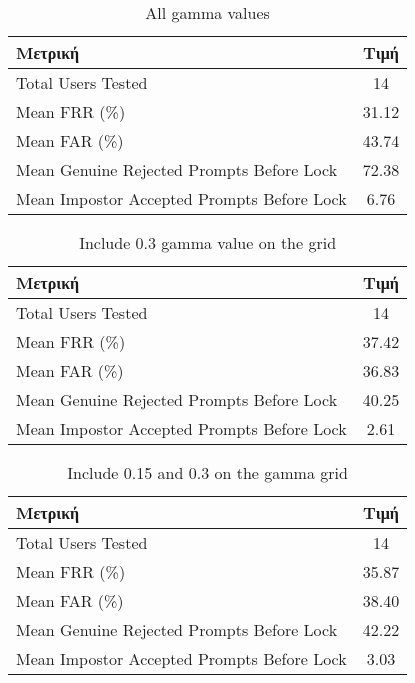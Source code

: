 \begin{table}[H]
\centering
\begin{tabular}{|l|c|}
\hline
\textbf{Μετρική}                                 & \textbf{Τιμή}   \\ \hline
Total Users Tested                               & 14             \\ \hline
Mean FRR (\%)                                    & 31.12          \\ \hline
Mean FAR (\%)                                    & 43.74          \\ \hline
Mean Genuine Rejected Prompts Before Lock       & 72.38          \\ \hline
Mean Impostor Accepted Prompts Before Lock      & 6.76           \\ \hline
\end{tabular}
\caption{All gamma values}
\end{table}

\begin{table}[H]
\centering
\begin{tabular}{|l|c|}
\hline
\textbf{Μετρική}                                 & \textbf{Τιμή}   \\ \hline
Total Users Tested                               & 14             \\ \hline
Mean FRR (\%)                                    & 37.42          \\ \hline
Mean FAR (\%)                                    & 36.83          \\ \hline
Mean Genuine Rejected Prompts Before Lock       & 40.25          \\ \hline
Mean Impostor Accepted Prompts Before Lock      & 2.61           \\ \hline
\end{tabular}
\caption{Include 0.3 gamma value on the grid}
\end{table}

\begin{table}[H]
\centering
\begin{tabular}{|l|c|}
\hline
\textbf{Μετρική}                                 & \textbf{Τιμή}   \\ \hline
Total Users Tested                               & 14             \\ \hline
Mean FRR (\%)                                    & 35.87          \\ \hline
Mean FAR (\%)                                    & 38.40          \\ \hline
Mean Genuine Rejected Prompts Before Lock       & 42.22          \\ \hline
Mean Impostor Accepted Prompts Before Lock      & 3.03           \\ \hline
\end{tabular}
\caption{Include 0.15 and 0.3 on the gamma grid}
\end{table}

